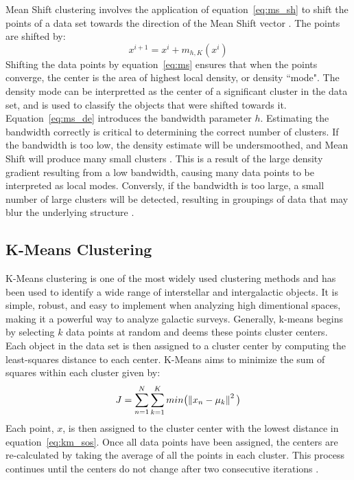 Mean Shift clustering involves the application of equation~\ref{eq:ms_sh} to shift the points of a data set towards the direction of the Mean Shift vector \citet{vatturi09}. 
The points are shifted by: 
\begin{equation}
\label{eq:ms}
x^{i+1} = x^i + m_{h,K}(x^i)
\end{equation}
Shifting the data points by equation~\ref{eq:ms} ensures that when the points converge, the center is the area of highest local density, or density ``mode". 
The density mode can be interpretted as the center of a significant cluster in the data set, and is used to classify the objects that were shifted towards it.
Equation~\ref{eq:ms_de} introduces the bandwidth parameter $h$. 
Estimating the bandwidth correctly is critical to determining the correct number of clusters.
If the bandwidth is too low, the density estimate will be undersmoothed, and Mean Shift will produce many small clusters \citet{vatturi09}. This is a result of the large density gradient resulting from a low bandwidth, causing many data points to be interpreted as local modes.
Conversly, if the bandwidth is too large, a small number of large clusters will be detected, resulting in groupings of data that may blur the underlying structure \citet{vatturi09}.

\subsection{K-Means Clustering}
K-Means clustering is one of the most widely used clustering methods and has been used to identify a wide range of interstellar and intergalactic objects. %
It is simple, robust, and easy to implement when analyzing high dimentional spaces, making it a powerful way to analyze galactic surveys. 
Generally, k-means begins by selecting $k$ data points at random and deems these points cluster centers. 
Each object in the data set is then assigned to a cluster center by computing the least-squares distance to each center.
K-Means aims to minimize the sum of squares within each cluster given by:
\begin{equation} 
\label{eq:km_sos}
J = \sum_{n=1}^N \sum_{k=1}^K min \big( \norm{x_n - \mu_k}^2 \big)
\end{equation}
Each point, $x$, is then assigned to the cluster center with the lowest distance in equation~\ref{eq:km_sos}\citet{tammour16}.
Once all data points have been assigned, the centers are re-calculated by taking the average of all the points in each cluster. 
This process continues until the centers do not change after two consecutive iterations \citet{sanchez-almeida13}. 

